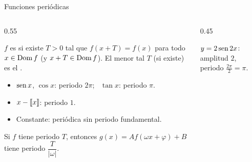 \documentclass[10pt,aspectratio=169]{beamer}
\begin{document}
\begin{frame}{Funciones periódicas}
  \begin{columns}
    \begin{column}{0.55\textwidth}
      \begin{definicion}
        $f$ es  si existe $T>0$ tal que $f(x+T)=f(x)$ para todo $x\in\operatorname{Dom} f$ (y $x+T\in\operatorname{Dom} f$).
        El menor tal $T$ (si existe) es el .
      \end{definicion}
      \begin{ejemplo}
        \begin{itemize}
          \item $\operatorname{sen} x$, $\cos x$: periodo $2\pi$; \ $\tan x$: periodo $\pi$.
          \item $x-\left\llbracket x\right\rrbracket$: periodo $1$.
          \item Constante: periódica sin periodo fundamental.
        \end{itemize}
      \end{ejemplo}
      \begin{proposicion}
        Si $f$ tiene periodo $T$, entonces $g(x)=Af(\omega x+\varphi)+B$ tiene periodo $\dfrac{T}{|\omega|}$.
      \end{proposicion}
    \end{column}
    \begin{column}{0.45\textwidth}
      \centering

      \small $y=2\operatorname{sen}2x$: amplitud $2$, periodo $\frac{2\pi}{2}=\pi$.
    \end{column}
  \end{columns}
\end{frame}
\end{document}
